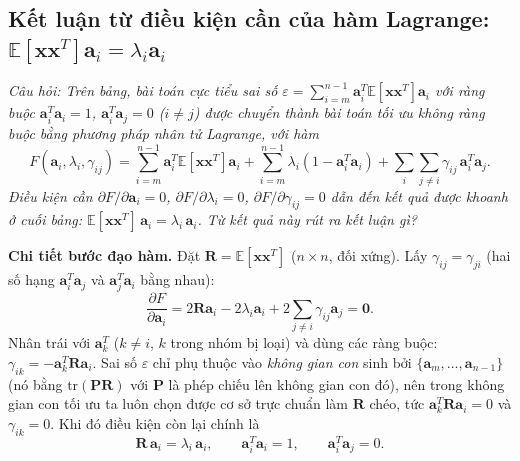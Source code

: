 \subsection{Kết luận từ điều kiện cần của hàm Lagrange: \texorpdfstring{$\mathbb{E}[\mathbf{x}\mathbf{x}^T]\mathbf{a}_i = \lambda_i\mathbf{a}_i$}{E[xx\^{}T] a\_i = lambda\_i a\_i}}
\label{subsec:w8_lagrange}

\textit{Câu hỏi: Trên bảng, bài toán cực tiểu sai số $\varepsilon = \sum_{i=m}^{n-1}\mathbf{a}_i^T\mathbb{E}[\mathbf{x}\mathbf{x}^T]\mathbf{a}_i$ với ràng buộc $\mathbf{a}_i^T\mathbf{a}_i = 1$, $\mathbf{a}_i^T\mathbf{a}_j = 0$ ($i \ne j$) được chuyển thành bài toán tối ưu không ràng buộc bằng phương pháp nhân tử Lagrange, với hàm
\[
F(\mathbf{a}_i, \lambda_i, \gamma_{ij}) = \sum_{i=m}^{n-1}\mathbf{a}_i^T\mathbb{E}[\mathbf{x}\mathbf{x}^T]\mathbf{a}_i + \sum_{i=m}^{n-1}\lambda_i(1 - \mathbf{a}_i^T\mathbf{a}_i) + \sum_{i}\sum_{j \ne i}\gamma_{ij}\,\mathbf{a}_i^T\mathbf{a}_j.
\]
Điều kiện cần $\partial F/\partial\mathbf{a}_i = 0$, $\partial F/\partial\lambda_i = 0$, $\partial F/\partial\gamma_{ij} = 0$ dẫn đến kết quả được khoanh ở cuối bảng: $\mathbb{E}[\mathbf{x}\mathbf{x}^T]\,\mathbf{a}_i = \lambda_i\,\mathbf{a}_i$. Từ kết quả này rút ra kết luận gì?}

\textbf{Chi tiết bước đạo hàm.} Đặt $\mathbf{R} = \mathbb{E}[\mathbf{x}\mathbf{x}^T]$ ($n \times n$, đối xứng). Lấy $\gamma_{ij} = \gamma_{ji}$ (hai số hạng $\mathbf{a}_i^T\mathbf{a}_j$ và $\mathbf{a}_j^T\mathbf{a}_i$ bằng nhau):
\begin{equation}
\frac{\partial F}{\partial\mathbf{a}_i} = 2\mathbf{R}\mathbf{a}_i - 2\lambda_i\mathbf{a}_i + 2\sum_{j \ne i}\gamma_{ij}\mathbf{a}_j = \mathbf{0}.
\end{equation}
Nhân trái với $\mathbf{a}_k^T$ ($k \ne i$, $k$ trong nhóm bị loại) và dùng các ràng buộc: $\gamma_{ik} = -\mathbf{a}_k^T\mathbf{R}\mathbf{a}_i$. Sai số $\varepsilon$ chỉ phụ thuộc vào \emph{không gian con} sinh bởi $\{\mathbf{a}_m, \ldots, \mathbf{a}_{n-1}\}$ (nó bằng $\mathrm{tr}(\mathbf{P}\mathbf{R})$ với $\mathbf{P}$ là phép chiếu lên không gian con đó), nên trong không gian con tối ưu ta luôn chọn được cơ sở trực chuẩn làm $\mathbf{R}$ chéo, tức $\mathbf{a}_k^T\mathbf{R}\mathbf{a}_i = 0$ và $\gamma_{ik} = 0$. Khi đó điều kiện còn lại chính là
\begin{equation}
\mathbf{R}\,\mathbf{a}_i = \lambda_i\,\mathbf{a}_i, \qquad \mathbf{a}_i^T\mathbf{a}_i = 1, \qquad \mathbf{a}_i^T\mathbf{a}_j = 0.
\end{equation}


